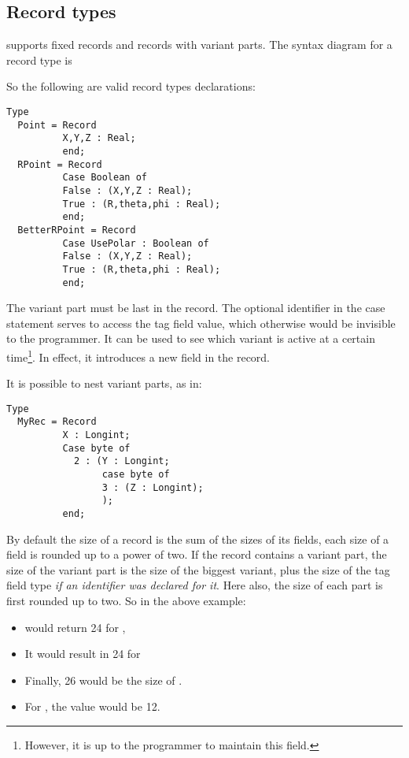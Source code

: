 \subsection{Record types}
\fpc supports fixed records and records with variant parts.
The syntax diagram for a record type is

 So the following are valid record types declarations:
\begin{verbatim}
Type
  Point = Record
          X,Y,Z : Real;
          end;
  RPoint = Record
          Case Boolean of
          False : (X,Y,Z : Real);
          True : (R,theta,phi : Real);
          end;
  BetterRPoint = Record
          Case UsePolar : Boolean of
          False : (X,Y,Z : Real);
          True : (R,theta,phi : Real);
          end;
\end{verbatim}
The variant part must be last in the record. The optional identifier in the
case statement serves to access the tag field value, which otherwise would
be invisible to the programmer. It can be used to see which variant is
active at a certain time\footnote{However, it is up to the programmer to maintain
this field.}. In effect, it introduces a new field in the record.
\begin{remark}
It is possible to nest variant parts, as in:
\begin{verbatim}
Type
  MyRec = Record
          X : Longint;
          Case byte of
            2 : (Y : Longint;
                 case byte of
                 3 : (Z : Longint);
                 );
          end;
\end{verbatim}
\end{remark}
By default the size of a record is the sum of the sizes of its fields, each size of a
field is rounded up to a power of two. If the record contains a variant part, the size
of the variant part is the size of the biggest variant, plus the size of the
tag field type {\em if an identifier was declared for it}. Here also, the size of
each part is first rounded up to two. So in the above example:
\begin{itemize}
\item {} would return 24 for , 
\item It would result in 24 for  
\item Finally, 26 would be the size of . 
\item For , the value would be 12.
\end{itemize}

